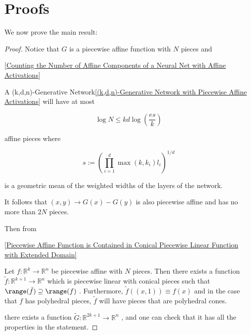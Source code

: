 \documentclass{article}
\begin{document}
\section{Proofs}\label{section:Proofs}
We now prove the main result:

\begin{proof}
    Notice that  $G$  is a piecewise affine function with  $N$  pieces and

    \autoref{Counting the Number of Affine Components of a Neural Net with Affine Activations}


    \begin{lemma}
        \label{Counting the Number of Affine Components of a Neural Net with Affine Activations}
        A (k,d,n)-Generative Network\ref{(k,d,n)-Generative Network with Piecewise Affine Activations} will have at most


        \begin{equation*}
            \log N \leq kd \log\left(\frac{e s}{k}\right)
        \end{equation*}

        affine pieces where


        \begin{equation*}
            s := \left( \prod_{i=1}^d \max(k, k_i)l_i \right)^{1/d}
        \end{equation*}

        is a geometric mean of the weighted widths of the layers of the network.


    \end{lemma}


    It follows that  $(x,y) \to G(x) - G(y)$  is also piecewise affine and has no more than  $2N$  pieces.

    Then from

    \autoref{Piecewise Affine Function is Contained in Conical Piecewise Linear Function with Extended Domain}


    \begin{lemma}
        \label{Piecewise Affine Function is Contained in Conical Piecewise Linear Function with Extended Domain}
        Let  $f:\mathbb{R}^k\to\mathbb{R}^n$  be piecewise affine with  $N$  pieces. Then there exists a function  $\tilde{f}:\mathbb{R}^{k+1} \to \mathbb{R}^n$  which is piecewise linear with conical pieces such that  $\range(\tilde{f})\supseteq\range(f)$ . Furthermore,  $\tilde{f}((x,1)) \equiv f(x)$  and in the case that  $f$  has polyhedral pieces,  $\tilde{f}$  will have pieces that are polyhedral cones.


    \end{lemma}


    there exists a function  $\tilde{G}:\mathbb{R}^{2k + 1} \to \mathbb{R}^n$ , and one can check that it has all the properties in the statement.


\end{proof}
\end{document}
